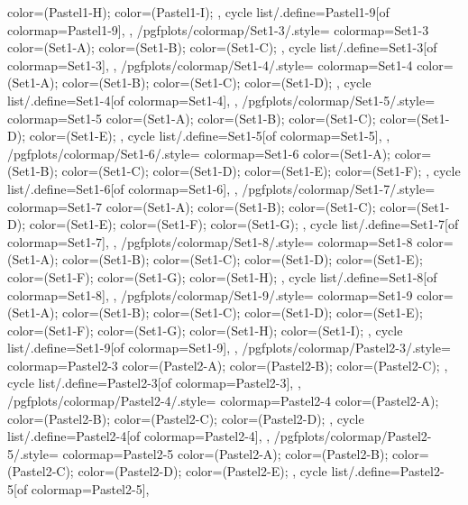 {{{      color=(Pastel1-H);
      color=(Pastel1-I);
    },
    cycle list/.define={Pastel1-9}{[of colormap=Pastel1-9]},
  },
  /pgfplots/colormap/Set1-3/.style={
    colormap={Set1-3}{
      color=(Set1-A);
      color=(Set1-B);
      color=(Set1-C);
    },
    cycle list/.define={Set1-3}{[of colormap=Set1-3]},
  },
  /pgfplots/colormap/Set1-4/.style={
    colormap={Set1-4}{
      color=(Set1-A);
      color=(Set1-B);
      color=(Set1-C);
      color=(Set1-D);
    },
    cycle list/.define={Set1-4}{[of colormap=Set1-4]},
  },
  /pgfplots/colormap/Set1-5/.style={
    colormap={Set1-5}{
      color=(Set1-A);
      color=(Set1-B);
      color=(Set1-C);
      color=(Set1-D);
      color=(Set1-E);
    },
    cycle list/.define={Set1-5}{[of colormap=Set1-5]},
  },
  /pgfplots/colormap/Set1-6/.style={
    colormap={Set1-6}{
      color=(Set1-A);
      color=(Set1-B);
      color=(Set1-C);
      color=(Set1-D);
      color=(Set1-E);
      color=(Set1-F);
    },
    cycle list/.define={Set1-6}{[of colormap=Set1-6]},
  },
  /pgfplots/colormap/Set1-7/.style={
    colormap={Set1-7}{
      color=(Set1-A);
      color=(Set1-B);
      color=(Set1-C);
      color=(Set1-D);
      color=(Set1-E);
      color=(Set1-F);
      color=(Set1-G);
    },
    cycle list/.define={Set1-7}{[of colormap=Set1-7]},
  },
  /pgfplots/colormap/Set1-8/.style={
    colormap={Set1-8}{
      color=(Set1-A);
      color=(Set1-B);
      color=(Set1-C);
      color=(Set1-D);
      color=(Set1-E);
      color=(Set1-F);
      color=(Set1-G);
      color=(Set1-H);
    },
    cycle list/.define={Set1-8}{[of colormap=Set1-8]},
  },
  /pgfplots/colormap/Set1-9/.style={
    colormap={Set1-9}{
      color=(Set1-A);
      color=(Set1-B);
      color=(Set1-C);
      color=(Set1-D);
      color=(Set1-E);
      color=(Set1-F);
      color=(Set1-G);
      color=(Set1-H);
      color=(Set1-I);
    },
    cycle list/.define={Set1-9}{[of colormap=Set1-9]},
  },
  /pgfplots/colormap/Pastel2-3/.style={
    colormap={Pastel2-3}{
      color=(Pastel2-A);
      color=(Pastel2-B);
      color=(Pastel2-C);
    },
    cycle list/.define={Pastel2-3}{[of colormap=Pastel2-3]},
  },
  /pgfplots/colormap/Pastel2-4/.style={
    colormap={Pastel2-4}{
      color=(Pastel2-A);
      color=(Pastel2-B);
      color=(Pastel2-C);
      color=(Pastel2-D);
    },
    cycle list/.define={Pastel2-4}{[of colormap=Pastel2-4]},
  },
  /pgfplots/colormap/Pastel2-5/.style={
    colormap={Pastel2-5}{
      color=(Pastel2-A);
      color=(Pastel2-B);
      color=(Pastel2-C);
      color=(Pastel2-D);
      color=(Pastel2-E);
    },
    cycle list/.define={Pastel2-5}{[of colormap=Pastel2-5]},
}}
